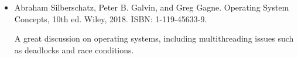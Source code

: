\begin{itemize}
\item
Abraham Silberschatz, Peter B. Galvin, and Greg Gagne. Operating System Concepts, 10th ed. Wiley, 2018. ISBN: 1-119-45633-9.

A great discussion on operating systems, including multithreading issues such as deadlocks and race conditions.
\end{itemize}